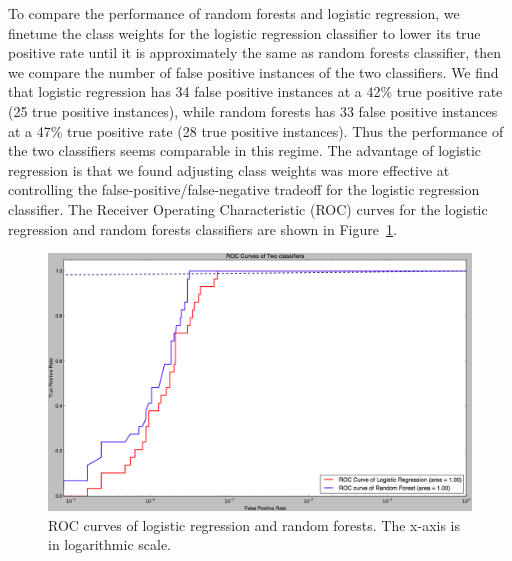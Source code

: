 To compare the performance of random forests and logistic regression, we finetune the class weights for the logistic regression classifier to lower its true positive rate until it is approximately the same as random forests classifier, then we compare the number of false positive instances of the two classifiers.
We find that logistic regression has 34 false positive instances at a 42\% true positive rate (25 true positive instances),
while random forests has 33 false positive instances at a 47\% true positive rate (28 true positive instances).
Thus the performance of the two classifiers seems comparable in this regime.
The advantage of logistic regression is that we found adjusting class weights was more effective at controlling the false-positive/false-negative tradeoff for the logistic regression classifier.
The Receiver Operating Characteristic (ROC) curves for the logistic regression and random forests classifiers are shown in Figure~\ref{fig:roc}.

\begin{figure}[t]
\begin{center}
\includegraphics[width=1.0\columnwidth]{roc_curves_log_line.png}
\end{center}
\caption{ROC curves of logistic regression and random forests. The x-axis is in logarithmic scale.}
\label{fig:roc}
\end{figure}


